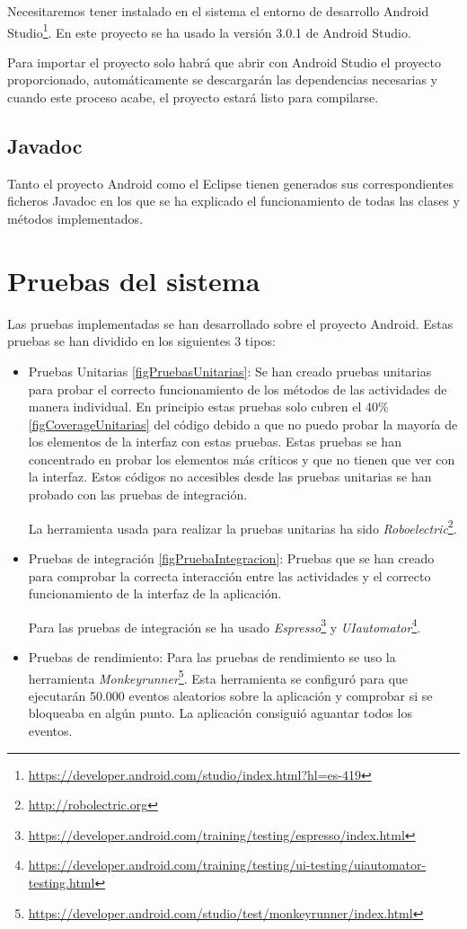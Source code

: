 Necesitaremos tener instalado en el sistema el entorno de desarrollo Android Studio\footnote{\url{https://developer.android.com/studio/index.html?hl=es-419}}. En este proyecto se ha usado la versión 3.0.1 de Android Studio.

Para importar el proyecto solo habrá que abrir con Android Studio el proyecto proporcionado, automáticamente se descargarán las dependencias necesarias y cuando este proceso acabe, el proyecto estará listo para compilarse.

\subsection{Javadoc}

Tanto el proyecto Android como el Eclipse tienen generados sus correspondientes ficheros Javadoc en los que se ha explicado el funcionamiento de todas las clases y métodos implementados.

\section{Pruebas del sistema}

Las pruebas implementadas se han desarrollado sobre el proyecto Android. Estas pruebas se han dividido en los siguientes 3 tipos:

\begin{itemize}
	\item Pruebas Unitarias \ref{figPruebasUnitarias}: Se han creado pruebas unitarias para probar el correcto funcionamiento de los métodos de las actividades de manera individual. En principio estas pruebas solo cubren el 40\% \ref{figCoverageUnitarias} del código debido a que no puedo probar la mayoría de los elementos de la interfaz con estas pruebas. Estas pruebas se han concentrado en probar los elementos más críticos y que no tienen que ver con la interfaz. Estos códigos no accesibles desde las pruebas unitarias se han probado con las pruebas de integración.
	
	La herramienta usada para realizar la pruebas unitarias ha sido \textit{Roboelectric}\footnote{\url{http://robolectric.org}}.
	\item Pruebas de integración \ref{figPruebaIntegracion}: Pruebas que se han creado para comprobar la correcta interacción entre las actividades y el correcto funcionamiento de la interfaz de la aplicación.
	
	Para las pruebas de integración se ha usado \textit{Espresso}\footnote{\url{https://developer.android.com/training/testing/espresso/index.html}} y \textit{UIautomator}\footnote{\url{https://developer.android.com/training/testing/ui-testing/uiautomator-testing.html}}.
	\item Pruebas de rendimiento: Para las pruebas de rendimiento se uso la herramienta \textit{Monkeyrunner}\footnote{\url{https://developer.android.com/studio/test/monkeyrunner/index.html}}. Esta herramienta se configuró para que ejecutarán 50.000 eventos aleatorios sobre la aplicación y comprobar si se bloqueaba en algún punto. La aplicación consiguió aguantar todos los eventos.
\end{itemize}

